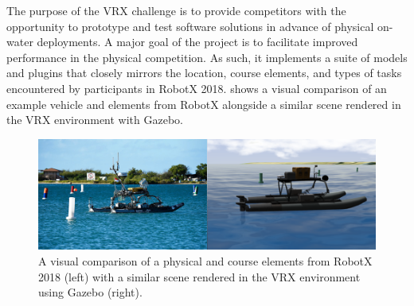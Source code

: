 \documentclass[utf8]{frontiersSCNS} %
\begin{document}
%
The purpose of the VRX challenge is to provide competitors with the opportunity to prototype and test software solutions in advance of physical on-water deployments. A major goal of the project is to facilitate improved performance in the physical competition. As such, it implements a suite of models and plugins that closely mirrors the location, course elements, and types of tasks encountered by participants in RobotX 2018.  shows a visual comparison of an example vehicle and elements from RobotX alongside a similar scene rendered in the VRX environment with Gazebo. %

\begin{figure}[hbt!]
  \centering
  \includegraphics[width=\FigWidth\textwidth]{images/robotx_vrx_wamv.png}
  \caption{A visual comparison of a physical \wamv{} and course elements from RobotX 2018 (left) with a similar scene rendered in the VRX environment using Gazebo (right).}
  \label{f:robotx_vrx}
\end{figure}
\end{document}
